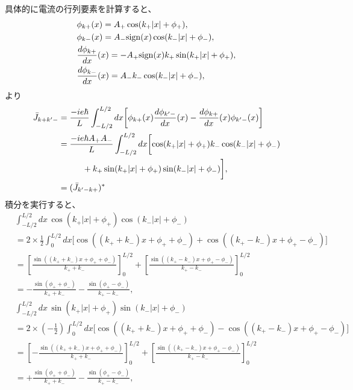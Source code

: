 \documentclass[10pt,a4j]{jarticle}
\begin{document}
具体的に電流の行列要素を計算すると、
\begin{align}
& \phi_{k+}(x) = A_+ \cos (k_+ |x| + \phi_+), \\
& \phi_{k-}(x) = A_- {\rm sign}(x) \cos (k_- |x| + \phi_-), \\
& \frac{d\phi_{k+}}{dx}(x) 
= - A_+ {\rm sign}(x) k_+ \sin (k_+ |x| + \phi_+), \\
& \frac{d\phi_{k-}}{dx}(x) = A_- k_- \cos (k_- |x| + \phi_-), 
\end{align}
より
\begin{align}
 \bar{J}_{k+ k^\prime -} &=
\frac{-ie\hbar}{L} \int_{-L/2}^{L/2} dx \biggl[ \phi_{k+}(x) \frac{d\phi_{k^\prime-}}{dx}(x)
- \frac{d\phi_{k+}}{dx}(x) \phi_{k^\prime-}(x) \biggr] \nonumber \\
&= \frac{-ie\hbar A_+ A_-}{L} \int_{-L/2}^{L/2} dx \biggl[ \cos(k_+|x|+\phi_+) k_-  \cos(k_-|x|+\phi_-) \nonumber \\
& \hspace{10mm} + k_+ \sin(k_+|x|+\phi_+) \sin(k_-|x|+\phi_-) \biggr] , \\
&= (\bar{J}_{k^\prime - k +} )^*
\end{align}
積分を実行すると、
\begin{align}
& \int_{-L/2}^{L/2} dx \, \cos(k_+|x|+\phi_+) \cos(k_-|x|+\phi_-) \nonumber \\
& =  2\times\frac12 \int_0^{L/2} dx  \biggl[
\cos((k_+ + k_-)x + \phi_+ + \phi_-) +\cos((k_+ - k_-)x + \phi_+ - \phi_-) \biggr] \nonumber \\
& = \left[ \frac{\sin((k_+ + k_-) x + \phi_+ + \phi_-)}{k_+ + k_-} \right]_0^{L/2}
+ \left[ \frac{\sin((k_+ - k_-) x + \phi_+ - \phi_-)}{k_+ - k_-} \right]_0^{L/2} \nonumber \\
& = - \frac{\sin(\phi_+ + \phi_-)}{k_+ + k_-} - \frac{\sin(\phi_+ - \phi_-)}{k_+ - k_-}, \\
& \int_{-L/2}^{L/2} dx \, \sin(k_+|x|+\phi_+) \sin(k_-|x|+\phi_-) \nonumber \\
& =  2\times\left(-\frac12\right) \int_0^{L/2} dx  \biggl[
\cos((k_+ + k_-)x + \phi_+ + \phi_-) -\cos((k_+ - k_-)x + \phi_+ - \phi_-) \biggr] \nonumber \\
& = \left[ - \frac{\sin((k_+ + k_-) x + \phi_+ + \phi_-)}{k_+ + k_-} \right]_0^{L/2}
+ \left[ \frac{\sin((k_+ - k_-) x + \phi_+ - \phi_-)}{k_+ - k_-} \right]_0^{L/2} \nonumber \\
& = + \frac{\sin(\phi_+ + \phi_-)}{k_+ + k_-} - \frac{\sin(\phi_+ - \phi_-)}{k_+ - k_-}, 
\end{align}
\end{document}
